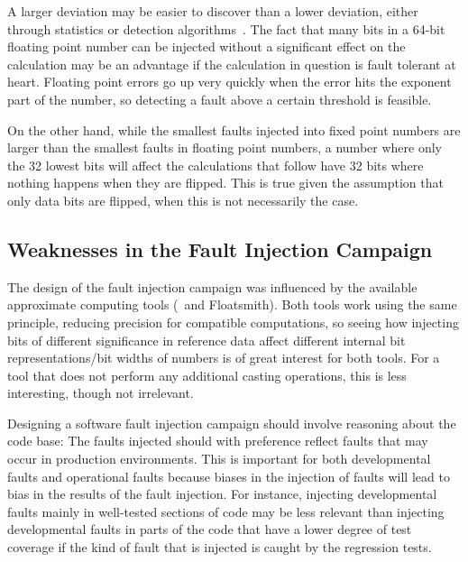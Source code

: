 A larger deviation may be easier to discover than a lower deviation, either through statistics or detection algorithms~\citep{hodge2004survey}. The fact that many bits in a 64-bit floating point number can be injected without a significant effect on the calculation may be an advantage if the calculation in question is fault tolerant at heart. Floating point errors go up very quickly when the error hits the exponent part of the number, so detecting a fault above a certain threshold is feasible.

On the other hand, while the smallest faults injected into fixed point numbers are larger than the smallest faults in floating point numbers, a number where only the 32 lowest bits will affect the calculations that follow have 32 bits where nothing happens when they are flipped. This is true given the assumption that only data bits are flipped, when this is not necessarily the case.

\subsection{Weaknesses in the Fault Injection Campaign}

The design of the fault injection campaign was influenced by the available approximate computing tools (\taffo\ and Floatsmith). Both tools work using the same principle, reducing precision for compatible computations, so seeing how injecting bits of different significance in reference data affect different internal bit representations/bit widths of numbers is of great interest for both tools. For a tool that does not perform any additional casting operations, this is less interesting, though not irrelevant. 

Designing a software fault injection campaign should involve reasoning about the code base: The faults injected should with preference reflect faults that may occur in production environments. This is important for both developmental faults and operational faults because biases in the injection of faults will lead to bias in the results of the fault injection. For instance, injecting developmental faults mainly in  well-tested sections of code may be less relevant than injecting developmental faults in parts of the code that have a lower degree of test coverage if the kind of fault that is injected is caught by the regression tests. 


